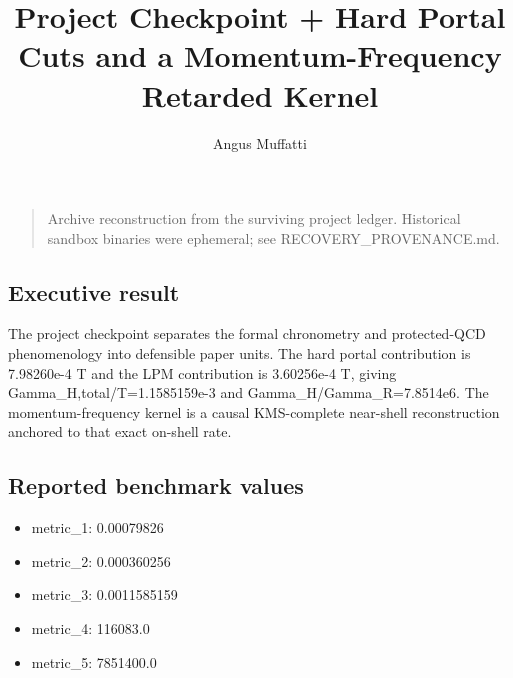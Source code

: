 \documentclass[
]{article}
\title{Project Checkpoint + Hard Portal Cuts and a Momentum-Frequency
Retarded Kernel}
\author{Angus Muffatti}
\date{}
\providecommand{\tightlist}{%
  \setlength{\itemsep}{0pt}\setlength{\parskip}{0pt}}
\begin{document}
\maketitle

\begin{quote}
Archive reconstruction from the surviving project ledger. Historical
sandbox binaries were ephemeral; see RECOVERY\_PROVENANCE.md.
\end{quote}

\hypertarget{executive-result}{%
\subsection{Executive result}\label{executive-result}}

The project checkpoint separates the formal chronometry and
protected-QCD phenomenology into defensible paper units. The hard portal
contribution is 7.98260e-4 T and the LPM contribution is 3.60256e-4 T,
giving Gamma\_H,total/T=1.1585159e-3 and Gamma\_H/Gamma\_R=7.8514e6. The
momentum-frequency kernel is a causal KMS-complete near-shell
reconstruction anchored to that exact on-shell rate.

\hypertarget{reported-benchmark-values}{%
\subsection{Reported benchmark values}\label{reported-benchmark-values}}

\begin{itemize}
\tightlist
\item
  metric\_1: 0.00079826
\item
  metric\_2: 0.000360256
\item
  metric\_3: 0.0011585159
\item
  metric\_4: 116083.0
\item
  metric\_5: 7851400.0
\end{itemize}
\end{document}
